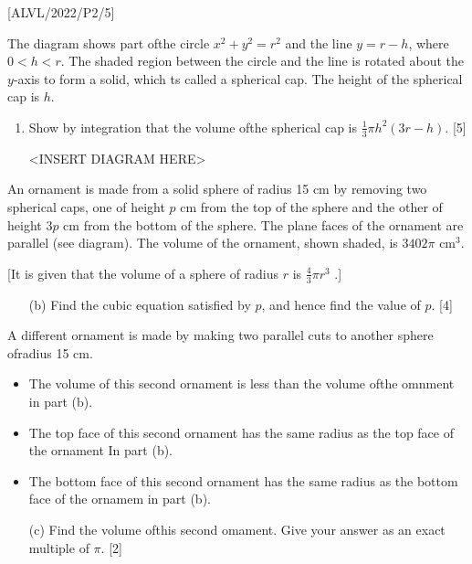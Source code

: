 \item {[}ALVL/2022/P2/5{]}

The diagram shows part ofthe circle $x^{2}+y^{2}=r^{2}$ and the line
$y=r-h$, where $0<h<r$. The shaded region between the circle and
the line is rotated about the $y$-axis to form a solid, which ts
called a spherical cap. The height of the spherical cap is $h$. 
\begin{enumerate}
\item Show by integration that the volume ofthe spherical cap is $\frac{1}{3}\pi h^{2}\left(3r-h\right)$.
\hfill{}{[}5{]}
\noindent \begin{center}
<INSERT DIAGRAM HERE>
\par\end{center}

\end{enumerate}
An ornament is made from a solid sphere of radius 15 cm by removing
two spherical caps, one of height $p$ cm from the top of the sphere
and the other of height $3p$ cm from the bottom of the sphere. The
plane faces of the ornament are parallel (see diagram). The volume
of the ornament, shown shaded, is $3402\pi$ $\mathrm{cm}^{3}$.

{[}It is given that the volume of a sphere of radius $r$ is $\frac{4}{3}\pi r^{3}$
.{]} 
\begin{enumerate}
\item[(b)]  Find the cubic equation satisfied by $p$, and hence find the value
of $p$. \hfill{}{[}4{]}
\end{enumerate}
A different ornament is made by making two parallel cuts to another
sphere ofradius 15 cm.
\begin{itemize}
\item The volume of this second ornament is less than the volume ofthe omnment
in part (b).
\item The top face of this second ornament has the same radius as the top
face of the ornament In part (b). 
\item The bottom face of this second ornament has the same radius as the
bottom face of the ornamem in part (b). 
\end{itemize}
\begin{enumerate}
\item[(c)]  Find the volume ofthis second omament. Give your answer as an exact
multiple of $\pi$.\hfill{} {[}2{]}
\end{enumerate}
